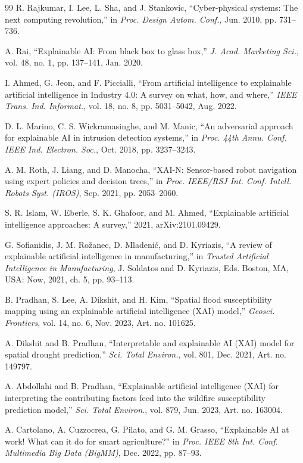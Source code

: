 \documentclass[a4paper,fleqn]{cas-dc}
\begin{document}
\begin{thebibliography}{99}
R. Rajkumar, I. Lee, L. Sha, and J. Stankovic, ``Cyber-physical systems: The next computing revolution,'' in \emph{Proc. Design Autom. Conf.}, Jun. 2010, pp. 731--736.

A. Rai, ``Explainable AI: From black box to glass box,'' \emph{J. Acad. Marketing Sci.}, vol. 48, no. 1, pp. 137--141, Jan. 2020.

I. Ahmed, G. Jeon, and F. Piccialli, ``From artificial intelligence to explainable artificial intelligence in Industry 4.0: A survey on what, how, and where,'' \emph{IEEE Trans. Ind. Informat.}, vol. 18, no. 8, pp. 5031--5042, Aug. 2022.

D. L. Marino, C. S. Wickramasinghe, and M. Manic, ``An adversarial approach for explainable AI in intrusion detection systems,'' in \emph{Proc. 44th Annu. Conf. IEEE Ind. Electron. Soc.}, Oct. 2018, pp. 3237--3243.

A. M. Roth, J. Liang, and D. Manocha, ``XAI-N: Sensor-based robot navigation using expert policies and decision trees,'' in \emph{Proc. IEEE/RSJ Int. Conf. Intell. Robots Syst. (IROS)}, Sep. 2021, pp. 2053--2060.

S. R. Islam, W. Eberle, S. K. Ghafoor, and M. Ahmed, ``Explainable artificial intelligence approaches: A survey,'' 2021, arXiv:2101.09429.

G. Sofianidis, J. M. Ro\v{z}anec, D. Mladeni\'{c}, and D. Kyriazis, ``A review of explainable artificial intelligence in manufacturing,'' in \emph{Trusted Artificial Intelligence in Manufacturing}, J. Soldatos and D. Kyriazis, Eds. Boston, MA, USA: Now, 2021, ch. 5, pp. 93--113.

B. Pradhan, S. Lee, A. Dikshit, and H. Kim, ``Spatial flood susceptibility mapping using an explainable artificial intelligence (XAI) model,'' \emph{Geosci. Frontiers}, vol. 14, no. 6, Nov. 2023, Art. no. 101625.

A. Dikshit and B. Pradhan, ``Interpretable and explainable AI (XAI) model for spatial drought prediction,'' \emph{Sci. Total Environ.}, vol. 801, Dec. 2021, Art. no. 149797.

A. Abdollahi and B. Pradhan, ``Explainable artificial intelligence (XAI) for interpreting the contributing factors feed into the wildfire susceptibility prediction model,'' \emph{Sci. Total Environ.}, vol. 879, Jun. 2023, Art. no. 163004.

A. Cartolano, A. Cuzzocrea, G. Pilato, and G. M. Grasso, ``Explainable AI at work! What can it do for smart agriculture?'' in \emph{Proc. IEEE 8th Int. Conf. Multimedia Big Data (BigMM)}, Dec. 2022, pp. 87--93.


\end{thebibliography}
\end{document}
